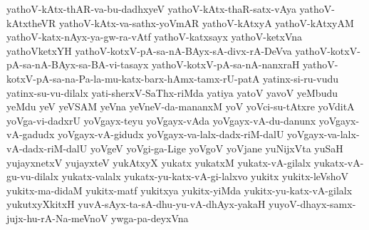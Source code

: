 {yathoV-kAtx-thAR-va-bu-dadhxyeV
yathoV-kAtx-thaR-satx-vAya
yathoV-kAtxtheVR
yathoV-kAtx-va-sathx-yoVmAR
yathoV-kAtxyA
yathoV-kAtxyAM
yathoV-katx-nAyx-ya-gw-ra-vAtf
yathoV-katxsayx
yathoV-ketxVna
yathoVketxYH
yathoV-kotxV-pA-sa-nA-BAyx-sA-divx-rA-DeVva
yathoV-kotxV-pA-sa-nA-BAyx-sa-BA-vi-tasayx
yathoV-kotxV-pA-sa-nA-nanxraH
yathoV-kotxV-pA-sa-na-Pa-la-mu-katx-barx-hAmx-tamx-rU-patA
yatinx-si-ru-vudu
yatinx-su-vu-dilalx
yati-sherxV-SaThx-riMda
yatiya
yatoV
yavoV
yeMbudu
yeMdu
yeV
yeVSAM
yeVna
yeVneV-da-mananxM
yoV
yoVci-su-tAtxre
yoVditA
yoVga-vi-dadxrU
yoVgayx-teyu
yoVgayx-vAda
yoVgayx-vA-du-danunx
yoVgayx-vA-gadudx
yoVgayx-vA-gidudx
yoVgayx-va-lalx-dadx-riM-dalU
yoVgayx-va-lalx-vA-dadx-riM-dalU
yoVgeV
yoVgi-ga-Lige
yoVgoV
yoVjane
yuNijxVta
yuSaH
yujayxnetxV
yujayxteV
yukAtxyX
yukatx
yukatxM
yukatx-vA-gilalx
yukatx-vA-gu-vu-dilalx
yukatx-valalx
yukatx-yu-katx-vA-gi-lalxvo
yukitx
yukitx-leVshoV
yukitx-ma-didaM
yukitx-matf
yukitxya
yukitx-yiMda
yukitx-yu-katx-vA-gilalx
yukutxyXkitxH
yuvA-sAyx-ta-sA-dhu-yu-vA-dhAyx-yakaH
yuyoV-dhayx-samx-jujx-hu-rA-Na-meVnoV
ywga-pa-deyxVna
}
